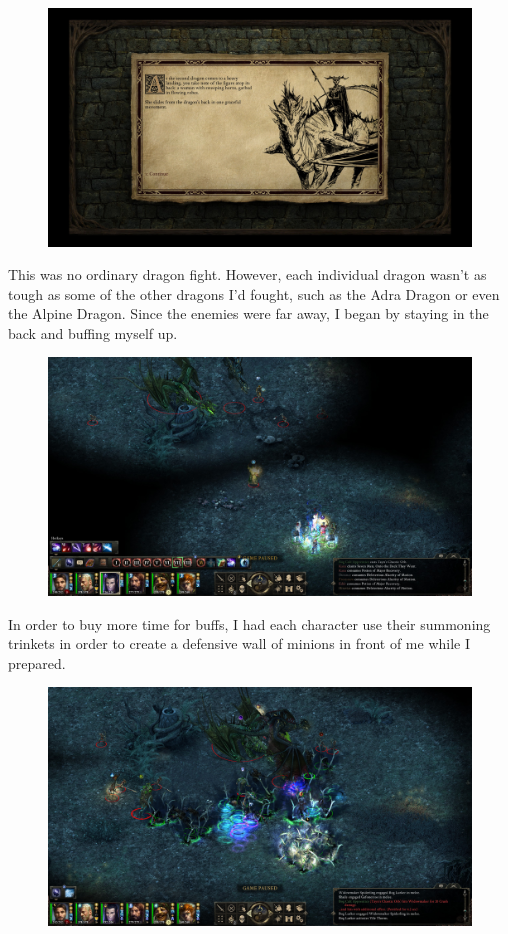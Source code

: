 \documentclass{article}
\begin{document}
\begin{figure}
\includegraphics[scale=0.33]{files/blog/2020_01_18_poe_potd_wmpt2/2020_01_18_llengrath0.jpg}
\end{figure}

This was no ordinary dragon fight.  However, each individual dragon wasn't as tough as some of the other dragons I'd fought, such as the Adra Dragon or even the Alpine Dragon.  Since the enemies were far away, I began by staying in the back and buffing myself up.

\begin{figure}
\includegraphics[scale=0.33]{files/blog/2020_01_18_poe_potd_wmpt2/2020_01_18_llengrath1.jpg}
\end{figure}

In order to buy more time for buffs, I had each character use their summoning trinkets in order to create a defensive wall of minions in front of me while I prepared.

\begin{figure}
\includegraphics[scale=0.33]{files/blog/2020_01_18_poe_potd_wmpt2/2020_01_18_llengrath2.jpg}
\end{figure}
\end{document}
